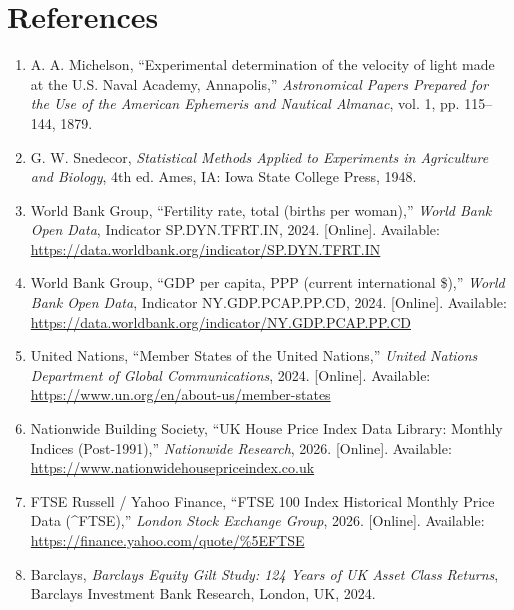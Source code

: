 \documentclass[11pt,a4paper]{article}
\begin{document}
\newpage
\section*{References}

\begin{enumerate}
    \item[{[1]}] A. A. Michelson, ``Experimental determination of the velocity of light made at the U.S. Naval Academy, Annapolis,'' \emph{Astronomical Papers Prepared for the Use of the American Ephemeris and Nautical Almanac}, vol. 1, pp. 115--144, 1879.
    \item[{[2]}] G. W. Snedecor, \emph{Statistical Methods Applied to Experiments in Agriculture and Biology}, 4th ed. Ames, IA: Iowa State College Press, 1948.
    \item[{[3]}] World Bank Group, ``Fertility rate, total (births per woman),'' \emph{World Bank Open Data}, Indicator SP.DYN.TFRT.IN, 2024. [Online]. Available: \url{https://data.worldbank.org/indicator/SP.DYN.TFRT.IN}
    \item[{[4]}] World Bank Group, ``GDP per capita, PPP (current international \$),'' \emph{World Bank Open Data}, Indicator NY.GDP.PCAP.PP.CD, 2024. [Online]. Available: \url{https://data.worldbank.org/indicator/NY.GDP.PCAP.PP.CD}
    \item[{[5]}] United Nations, ``Member States of the United Nations,'' \emph{United Nations Department of Global Communications}, 2024. [Online]. Available: \url{https://www.un.org/en/about-us/member-states}
    \item[{[6]}] Nationwide Building Society, ``UK House Price Index Data Library: Monthly Indices (Post-1991),'' \emph{Nationwide Research}, 2026. [Online]. Available: \url{https://www.nationwidehousepriceindex.co.uk}
    \item[{[7]}] FTSE Russell / Yahoo Finance, ``FTSE 100 Index Historical Monthly Price Data (\^{}FTSE),'' \emph{London Stock Exchange Group}, 2026. [Online]. Available: \url{https://finance.yahoo.com/quote/%5EFTSE}
    \item[{[8]}] Barclays, \emph{Barclays Equity Gilt Study: 124 Years of UK Asset Class Returns}, Barclays Investment Bank Research, London, UK, 2024.
\end{enumerate}
\end{document}
